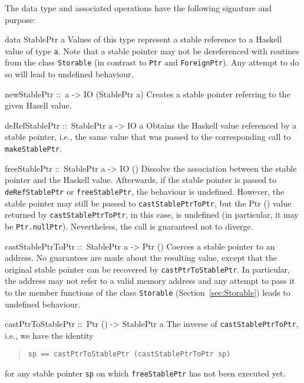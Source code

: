 \documentclass[a4paper,twosides]{article}
\makeatletter
\newcommand{\code}[1]{\texttt{#1}}      %
\newenvironment{codedesc}{%
  \list{}{\labelwidth\z@
    \let\makelabel\codedesclabel}
  }{%
  \endlist
  }
\newcommand*{\codedesclabel}[1]{%
  \hspace{-\leftmargin}
  \parbox[b]{\labelwidth}{\makebox[0pt][l]{\code{#1}}\\}\hfil\relax
  }
\makeatother
\begin{document}
The data type and associated operations have the following signature and
purpose:
%
\begin{codedesc}
\item[data StablePtr a] Values of this type represent a stable reference to a
  Haskell value of type \code{a}.  Note that a stable pointer may not be
  dereferenced with routines from the class \code{Storable} (in contrast to
  \code{Ptr} and \code{ForeignPtr}).  Any attempt to do so will lead to
  undefined behaviour.
  
\item[newStablePtr ::\ a -> IO (StablePtr a)] Creates a stable pointer
  referring to the given Hasell value.
  
\item[deRefStablePtr ::\ StablePtr a -> IO a] Obtains the Haskell value
  referenced by a stable pointer, i.e., the same value that was passed to the
  corresponding call to \code{makeStablePtr}.
  
\item[freeStablePtr ::\ StablePtr a -> IO ()] Dissolve the association between
  the stable pointer and the Haskell value. Afterwards, if the stable pointer
  is passed to \code{deRefStablePtr} or \code{freeStablePtr}, the behaviour is
  undefined.  However, the stable pointer may still be passed to
  \code{castStablePtrToPtr}, but the Ptr () value returned by
  \code{castStablePtrToPtr}, in this case, is undefined (in particular, it may
  be \code{Ptr.nullPtr}).  Nevertheless, the call is guaranteed not to
  diverge.
  
\item[castStablePtrToPtr ::\ StablePtr a -> Ptr ()] Coerces a stable pointer
  to an address. No guarantees are made about the resulting value, except that
  the original stable pointer can be recovered by \code{castPtrToStablePtr}.
  In particular, the address may not refer to a valid memory address and any
  attempt to pass it to the member functions of the class \code{Storable}
  (Section~\ref{sec:Storable}) leads to undefined behaviour.
  
\item[castPtrToStablePtr ::\ Ptr () -> StablePtr a] The inverse of
  \code{castStablePtrToPtr}, i.e., we have the identity
  \begin{quote}
\begin{verbatim}
sp == castPtrToStablePtr (castStablePtrToPtr sp)
\end{verbatim}
  \end{quote}
  for any stable pointer \code{sp} on which \code{freeStablePtr} has not been
  executed yet.
\end{codedesc}
\end{document}
